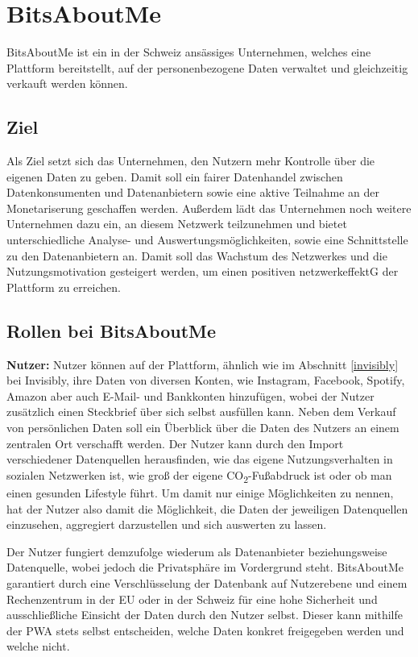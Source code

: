 \section{BitsAboutMe}
BitsAboutMe ist ein in der Schweiz ansässiges Unternehmen, welches eine Plattform bereitstellt, auf der personenbezogene Daten verwaltet und gleichzeitig verkauft werden können.

\subsection{Ziel}
Als Ziel setzt sich das Unternehmen, den Nutzern mehr Kontrolle über die eigenen Daten zu geben. Damit soll ein fairer Datenhandel zwischen Datenkonsumenten und Datenanbietern sowie eine aktive Teilnahme an der Monetariserung geschaffen werden. Außerdem lädt das Unternehmen noch weitere Unternehmen dazu ein, an diesem Netzwerk teilzunehmen und bietet unterschiedliche Analyse- und Auswertungsmöglichkeiten, sowie eine Schnittstelle zu den Datenanbietern an. Damit soll das Wachstum des Netzwerkes und die Nutzungsmotivation gesteigert werden, um einen positiven \gls{netzwerkeffektG} der Plattform zu erreichen.

\subsection{Rollen bei BitsAboutMe}
\textbf{Nutzer:} Nutzer können auf der Plattform, ähnlich wie im Abschnitt \ref{invisibly} bei Invisibly, ihre Daten von diversen Konten, wie Instagram, Facebook, Spotify, Amazon aber auch E-Mail- und Bankkonten hinzufügen, wobei der Nutzer zusätzlich einen Steckbrief über sich selbst ausfüllen kann. Neben dem Verkauf von persönlichen Daten soll ein Überblick über die Daten des Nutzers an einem zentralen Ort verschafft werden. Der Nutzer kann durch den Import verschiedener Datenquellen herausfinden, wie das eigene Nutzungsverhalten in sozialen Netzwerken ist, wie groß der eigene CO\textsubscript{2}-Fußabdruck ist oder ob man einen gesunden Lifestyle führt. Um damit nur einige Möglichkeiten zu nennen, hat der Nutzer also damit die Möglichkeit, die Daten der jeweiligen Datenquellen einzusehen, aggregiert darzustellen und sich auswerten zu lassen. \newline

\noindent Der Nutzer fungiert demzufolge wiederum als Datenanbieter beziehungsweise Datenquelle, wobei jedoch die Privatsphäre im Vordergrund steht. BitsAboutMe garantiert durch eine Verschlüsselung der Datenbank auf Nutzerebene und einem Rechenzentrum in der EU oder in der Schweiz für eine hohe Sicherheit und ausschließliche Einsicht der Daten durch den Nutzer selbst. Dieser kann mithilfe der \gls{PWA} stets selbst entscheiden, welche Daten konkret freigegeben werden und welche nicht. \newline

